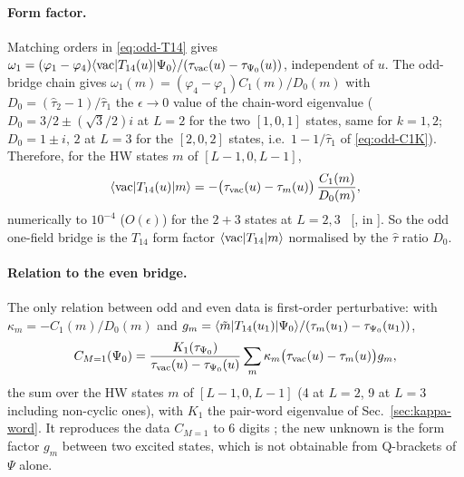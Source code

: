 \paragraph{Form factor.} Matching orders in \eqref{eq:odd-T14} gives $\omega_1=(\varphi_1-\varphi_4)\langle\mathrm{vac}| T_{14}(u)|\Psi_0\rangle/(\tau_{\rm vac}(u)-\tau_{\Psi_0}(u))$,
independent of $u$. The odd-bridge chain gives $\omega_1(m)=(\varphi_4-\varphi_1)C_1(m)/D_0(m)$ with $D_0=(\hat\tau_2-1)/\hat\tau_1$ the $\epsilon\to0$ value of the chain-word eigenvalue
($D_0=3/2\pm(\sqrt3/2)i$ at $L=2$ for the two $[1,0,1]$ states, same for $k=1,2$; $D_0=1\pm i,\,2$ at $L=3$ for the $[2,0,2]$ states, i.e.\ $1-1/\hat\tau_1$ of \eqref{eq:odd-C1K}).
Therefore, for the HW states $m$ of $[L-1,0,L-1]$,
\begin{equation}\label{eq:odd-ff}
 \langle\mathrm{vac}|T_{14}(u)|m\rangle=-\big(\tau_{\rm vac}(u)-\tau_m(u)\big)\,\frac{C_1(m)}{D_0(m)} ,
\end{equation}
numerically to $10^{-4}$ ($O(\epsilon)$) for the $2+3$ states at $L=2,3$ \npy\ [,  in ]. So the odd one-field bridge is the
$T_{14}$ form factor $\langle\mathrm{vac}| T_{14}|m\rangle$ normalised by the $\hat\tau$ ratio $D_0$.

\paragraph{Relation to the even bridge.} The only relation between odd and even data is first-order perturbative: with $\kappa_m=-C_1(m)/D_0(m)$ and
$g_m=\langle\tilde m|T_{14}(u_1)|\Psi_0\rangle/(\tau_m(u_1)-\tau_{\Psi_0}(u_1))$,
\begin{equation}
 C_{M=1}(\Psi_0)=\frac{K_1(\tau_{\Psi_0})}{\tau_{\rm vac}(u)-\tau_{\Psi_0}(u)}\sum_m\kappa_m\big(\tau_{\rm vac}(u)-\tau_m(u)\big)g_m ,
\end{equation}
the sum over the HW states $m$ of $[L-1,0,L-1]$ (4 at $L=2$, 9 at $L=3$ including non-cyclic ones), with $K_1$ the pair-word eigenvalue of Sec.~\ref{sec:kappa-word}. It reproduces the data $C_{M=1}$
to $6$ digits \npy; the new unknown is the form factor $g_m$ between two excited states, which is not obtainable from Q-brackets of $\Psi$ alone.
\endgroup
